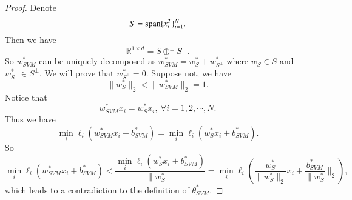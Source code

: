 \begin{proof}
	Denote
	\begin{equation}
		S = {\rm span} \{x_i^T\}_{i=1}^N.
	\end{equation}
	Then we have
	\begin{equation}
		\mathbb{R}^{1\times d} = S \oplus^{\perp} S^{\perp}.
	\end{equation}
	So $w_{SVM}^*$ can be uniquely decomposed as $w_{SVM}^* = w^*_S + w^*_{S^{\perp}}$ where $w_S\in S$ and $w^*_{S^{\perp}}\in S^{\perp}$. 
	We will prove that $w^*_{S^{\perp}} = 0$. Suppose not, we have
	\begin{equation}
		\|w^*_S\|_2 < \|w_{SVM}^*\|_2 = 1. 
	\end{equation}
	Notice that
	\begin{equation}
		w_{SVM}^* x_i = w_S^* x_i,\ \forall i = 1,2,\cdots,N.
	\end{equation}
	Thus we have
	\begin{equation}
		\min_{i} \ell_i(w_{SVM}^*x_i+b_{SVM}^*) = \min_{i} \ell_i(w_S^*x_i+b_{SVM}^*).
	\end{equation}
	So
	\begin{equation}
	\min_{i} \ell_i(w_{SVM}^*x_i+b_{SVM}^*) < \frac{\min_{i} \ell_i(w_S^*x_i+b_{SVM}^*)}{\|w_S^*\|} = \min_{i} \ell_i(\frac{w^*_S}{\|w_S^*\|_2}x_i+\frac{b_{SVM}^*}{\|w^*_S}\|_2),
	\end{equation}
	which leads to a contradiction to the definition of $\theta_{SVM}^*$.
\end{proof}

